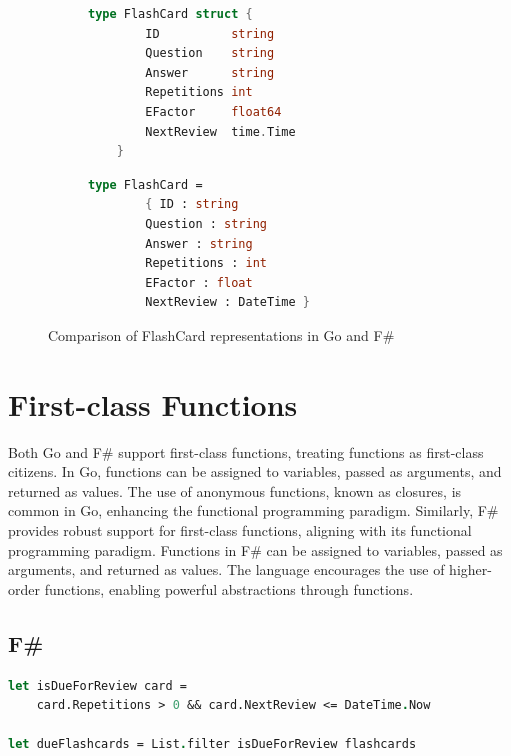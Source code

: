 \begin{figure}[ht]
    \begin{subfigure}{0.48\textwidth}
        \begin{lstlisting}[language=go, firstnumber=1, caption={FlashCard representation in Go}, label=l:flashcardgo]
    type FlashCard struct {
        ID          string
        Question    string
        Answer      string
        Repetitions int
        EFactor     float64
        NextReview  time.Time
    }
        \end{lstlisting}
    \end{subfigure}\hfill
    \begin{subfigure}{0.48\textwidth}
        \begin{lstlisting}[language=FSharp, firstnumber=1, caption={FlashCard representation in F\#}, label=l:flashcardfsharp]
    type FlashCard =
        { ID : string
        Question : string
        Answer : string
        Repetitions : int
        EFactor : float
        NextReview : DateTime }
        \end{lstlisting}
    \end{subfigure}
    \caption{Comparison of FlashCard representations in Go and F\#}
    \label{fig:flashcardcomparison}
    \end{figure}

    \section{First-class Functions}\label{sec:first-class-functions}
    Both Go and F\# support first-class functions, treating functions as first-class citizens. In Go, functions can be assigned to variables, passed as arguments, and returned as values. The use of anonymous functions, known as closures, is common in Go, enhancing the functional programming paradigm. Similarly, F\# provides robust support for first-class functions, aligning with its functional programming paradigm. Functions in F\# can be assigned to variables, passed as arguments, and returned as values. The language encourages the use of higher-order functions, enabling powerful abstractions through functions.

    \subsection*{F\#}
        \begin{lstlisting}[language=fsharp, firstnumber=1,float=tp, caption={First-class function reresentation in F\#}, label=l:flashcardfunction]
let isDueForReview card =
    card.Repetitions > 0 && card.NextReview <= DateTime.Now
        
let dueFlashcards = List.filter isDueForReview flashcards
        \end{lstlisting}
        
